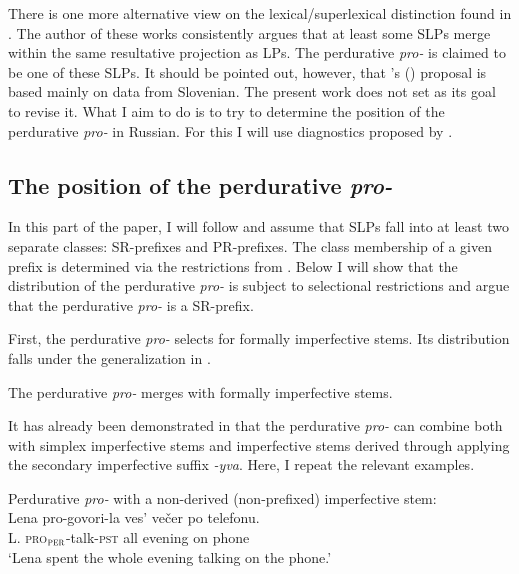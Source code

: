 \documentclass[output=paper,
]{langscibook}
\begin{document}
There is one more alternative view on the lexical/superlexical distinction found in  \citet{Žaucer2009vp,Žaucer2012syntax}. The author of these works consistently argues that at least some SLPs merge within the same resultative projection as LPs. The perdurative \textit{pro-} is claimed to be one of these SLPs. It should be pointed out, however, that \citeauthor{Žaucer2009vp}'s (\citeyear{Žaucer2009vp,Žaucer2012syntax}) proposal is based mainly on data from Slovenian. The present work does not set as its goal to revise it. What I aim to do is to try to determine the position of the perdurative \textit{pro-} in Russian. For this I will use diagnostics proposed by \citet{tatevosov2009mnozestvennaja, tatevosov2013mnozestvennaja}.

\subsection{The position of the perdurative \textit{pro-}} \label{2.2}
In this part of the paper, I will follow \cite{tatevosov2009mnozestvennaja,tatevosov2013mnozestvennaja} and assume that SLPs fall into at least two separate classes: SR-prefixes and PR-prefixes. 
The class membership of a given prefix is determined via the restrictions from . Below I will show that the distribution of the perdurative \textit{pro-} is subject to selectional restrictions and argue that the perdurative \textit{pro-} is a SR-prefix.

First, the perdurative \textit{pro-} selects for formally imperfective stems. Its distribution falls under the generalization in . 

\ea \label{ex:naumov:7}
The perdurative \textit{pro-} merges with formally imperfective stems.
\z

\noindent It has already been demonstrated in  that the perdurative \textit{pro-} can combine both with simplex imperfective stems and imperfective stems derived through applying the secondary imperfective suffix \textit{-yva}. Here, I repeat the relevant examples.

    \ea Perdurative \textit{pro-} with a non-derived (non-prefixed) imperfective stem:\label{ex:naumov:8}\smallskip\\
    \gll Lena	pro-govori-la		ves’	večer		po	telefonu. \\
L. \textsc{pro}$_\textsc{per}$-talk-\textsc{pst}	all	evening	on	phone\\
\glt `Lena spent the whole evening talking on the phone.'
\z
\end{document}
